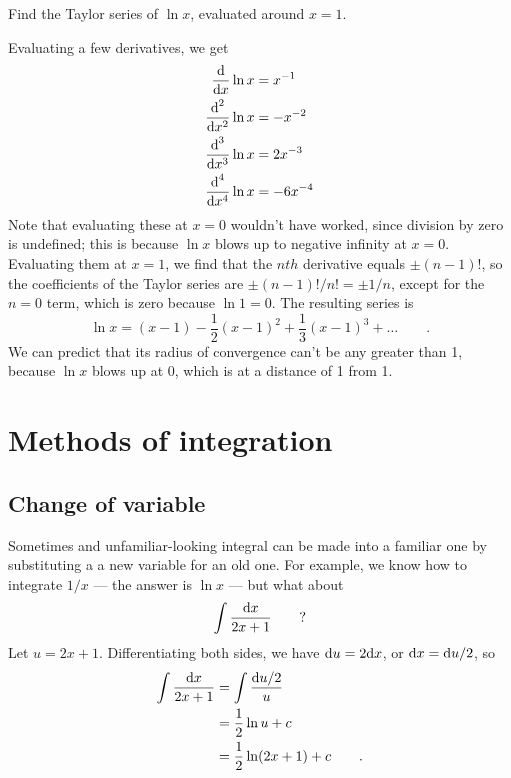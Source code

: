 \begin{eg}
\egquestion
Find the Taylor series of $\ln x$, evaluated around $x=1$.

\eganswer
Evaluating a few derivatives, we get
\begin{align*}
  \frac{\textup{d}}{\textup{d} x}\ln x &= x^{-1} \\
  \frac{\textup{d}^2}{\textup{d} x^2}\ln x &= -x^{-2}\\
  \frac{\textup{d}^3}{\textup{d} x^3}\ln x &= 2x^{-3}\\
  \frac{\textup{d}^4}{\textup{d} x^4}\ln x &= -6x^{-4}
\end{align*}
Note that evaluating these at $x=0$ wouldn't have worked, since division by zero is undefined;
this is because $\ln x$ blows up to negative infinity at $x=0$. Evaluating them at $x=1$, we
find that the $nth$ derivative equals $\pm (n-1)!$, so the coefficients of the Taylor
series are $\pm (n-1)!/n!=\pm1/n$, except for the $n=0$ term, which is zero because
$\ln 1=0$. The resulting series is
\begin{equation*}
  \ln x = (x-1) - \frac{1}{2}(x-1)^2 + \frac{1}{3}(x-1)^3 + \ldots \qquad .
\end{equation*}
We can predict that its radius of convergence can't be any greater than 1, because
$\ln x$ blows up at 0, which is at a distance of 1 from 1.
\end{eg}

\section{Methods of integration}

\subsection{Change of variable}

Sometimes and unfamiliar-looking integral can be made into a familiar one by substituting a
a new variable for an old one. For example, we know how to integrate $1/x$ --- the answer
is $\ln x$ --- but what about
\begin{equation*}
  \int \frac{\textup{d} x}{2x+1}   \qquad ?
\end{equation*}
Let $u=2x+1$. Differentiating both sides, we have $\textup{d} u=2\textup{d} x$, or $\textup{d} x=\textup{d} u/2$, so
\begin{align*}
  \int \frac{\textup{d} x}{2x+1}   &= \int \frac{\textup{d} u/2}{u} \\
       &= \frac{1}{2}\ln u + c \\
       &= \frac{1}{2}\ln(2x+1) +c \qquad .
\end{align*}

